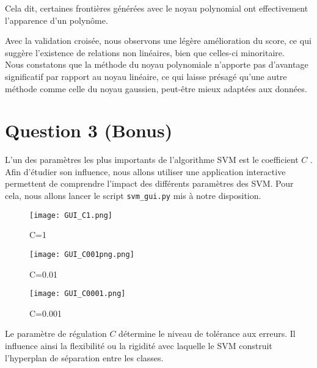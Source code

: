 \documentclass{article}
\begin{document}
Cela dit, certaines frontières générées avec le noyau polynomial ont effectivement l'apparence d'un polynôme.

Avec la validation croisée, nous observons une légère amélioration du score, ce qui suggère l'existence de relations non linéaires, bien que celles-ci minoritaire.\\





Nous constatons que la méthode du noyau polynomiale n'apporte pas d'avantage significatif par rapport au noyau linéaire, ce qui laisse présagé qu'une autre méthode comme celle du noyau gaussien, peut-être mieux adaptées aux données.


\section{Question 3 (Bonus)}



L'un des paramètres les plus importants de l'algorithme SVM est le coefficient $C$ . Afin d'étudier son influence, nous allons utiliser une application interactive permettent de comprendre l'impact des différents paramètres des SVM. Pour cela, nous allons lancer le script \texttt{svm\_gui.py} mis à notre disposition. 

\begin{figure}[ht]
    \centering
    \begin{minipage}{0.3\textwidth}
        \centering
        \texttt{[image: GUI\_C1.png]}
        \caption{C=1}
        \label{fig:figure6}
    \end{minipage}\hfill
    \begin{minipage}{0.3\textwidth}
        \centering
        \texttt{[image: GUI\_C001png.png]}
        \caption{C=0.01}
        \label{fig:figure7}
    \end{minipage}\hfill
    \begin{minipage}{0.3\textwidth}
        \centering
        \texttt{[image: GUI\_C0001.png]}
        \caption{C=0.001}
        \label{fig:figure8}
    \end{minipage}
\end{figure}


Le paramètre de régulation $C$ détermine le niveau de tolérance aux erreurs. Il influence ainsi la flexibilité ou la rigidité avec laquelle le SVM construit l'hyperplan de séparation entre les classes.
\end{document}
